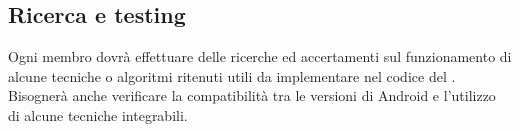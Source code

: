 \subsection{Ricerca e testing}
Ogni membro dovrà effettuare delle ricerche ed accertamenti sul funzionamento di alcune tecniche o algoritmi ritenuti utili da implementare nel codice del . 
Bisognerà anche verificare la compatibilità tra le versioni di Android e l'utilizzo di alcune tecniche integrabili. 

\clearpage